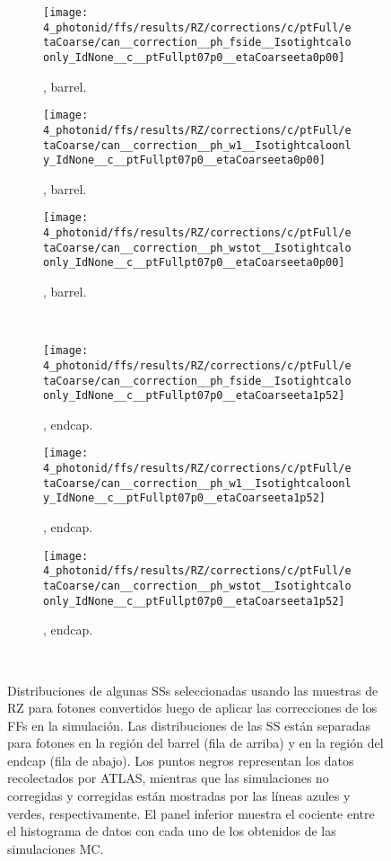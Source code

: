 \begin{figure}[ht!]
    \centering
    \begin{subfigure}[h]{0.32\linewidth}
        \centering
        \texttt{[image: 4\_photonid/ffs/results/RZ/corrections/c/ptFull/etaCoarse/can\_\_correction\_\_ph\_fside\_\_Isotightcaloonly\_IdNone\_\_c\_\_ptFullpt07p0\_\_etaCoarseeta0p00]}
        \caption{\fside, barrel.}
    \end{subfigure}
    \hfill
    \begin{subfigure}[h]{0.32\linewidth}
        \centering
        \texttt{[image: 4\_photonid/ffs/results/RZ/corrections/c/ptFull/etaCoarse/can\_\_correction\_\_ph\_w1\_\_Isotightcaloonly\_IdNone\_\_c\_\_ptFullpt07p0\_\_etaCoarseeta0p00]}
        \caption{\wone, barrel.}
    \end{subfigure}
    \hfill
    \begin{subfigure}[h]{0.32\linewidth}
        \centering
        \texttt{[image: 4\_photonid/ffs/results/RZ/corrections/c/ptFull/etaCoarse/can\_\_correction\_\_ph\_wstot\_\_Isotightcaloonly\_IdNone\_\_c\_\_ptFullpt07p0\_\_etaCoarseeta0p00]}
        \caption{\wstot, barrel.}
    \end{subfigure}\\
    \begin{subfigure}[h]{0.32\linewidth}
        \centering
        \texttt{[image: 4\_photonid/ffs/results/RZ/corrections/c/ptFull/etaCoarse/can\_\_correction\_\_ph\_fside\_\_Isotightcaloonly\_IdNone\_\_c\_\_ptFullpt07p0\_\_etaCoarseeta1p52]}
        \caption{\fside, endcap.}
    \end{subfigure}
    \hfill
    \begin{subfigure}[h]{0.32\linewidth}
        \centering
        \texttt{[image: 4\_photonid/ffs/results/RZ/corrections/c/ptFull/etaCoarse/can\_\_correction\_\_ph\_w1\_\_Isotightcaloonly\_IdNone\_\_c\_\_ptFullpt07p0\_\_etaCoarseeta1p52]}
        \caption{\wone, endcap.}
    \end{subfigure}
    \hfill
    \begin{subfigure}[h]{0.32\linewidth}
        \centering
        \texttt{[image: 4\_photonid/ffs/results/RZ/corrections/c/ptFull/etaCoarse/can\_\_correction\_\_ph\_wstot\_\_Isotightcaloonly\_IdNone\_\_c\_\_ptFullpt07p0\_\_etaCoarseeta1p52]}
        \caption{\wstot, endcap.}
    \end{subfigure}\\
    \caption{Distribuciones de algunas \acp{SS} seleccionadas usando las muestras de \ac{RZ} para fotones convertidos luego de aplicar las correcciones de los \acp{FF} en la simulaci\'on. Las distribuciones de las \ac{SS} est\'an separadas para fotones en la regi\'on del barrel (fila de arriba) y en la regi\'on del endcap (fila de abajo). Los puntos negros representan los datos recolectados por \ac{ATLAS}, mientras que las simulaciones no corregidas y corregidas est\'an mostradas por las l\'ineas azules y verdes, respectivamente. El panel inferior muestra el cociente entre el histograma de datos con cada uno de los obtenidos de las simulaciones \ac{MC}.}
    \label{fig:ss_corrections:ffs:results:ss_rz}
\end{figure}

